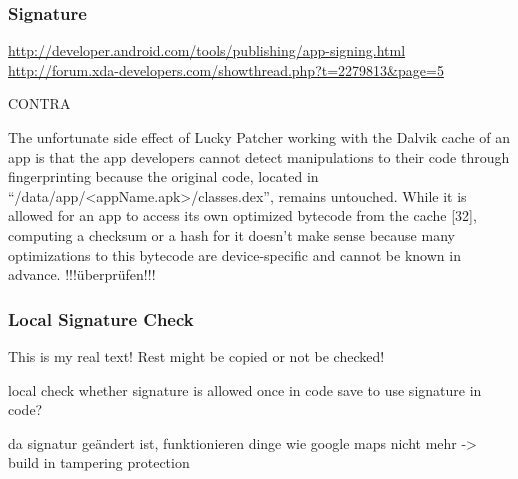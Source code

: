 \subsubsection{Signature} \label{subsection:counter-improve-tampering-signature}




\url{http://developer.android.com/tools/publishing/app-signing.html}\newline
\url{http://forum.xda-developers.com/showthread.php?t=2279813&page=5}\newline

CONTRA\newline


The unfortunate side effect of Lucky Patcher working with the Dalvik cache of an app is that the app developers cannot detect manipulations to their code through fingerprinting because the original code, located in “/data/app/<appName.apk>/classes.dex”, remains untouched. While it is allowed for an app to access its own optimized bytecode from the cache [32], computing a checksum or a hash for it doesn’t make sense because many optimizations to this bytecode are device-specific and cannot be known in advance.
\cite{munteanLicense}
!!!überprüfen!!!


\subsubsection{Local Signature Check} \label{subsection:counter-tampering-signature-local}
This is my real text! Rest might be copied or not be checked!



local check whether signature is allowed\newline
once in code \newline
save to use signature in code?\newline



da signatur geändert ist, funktionieren dinge wie google maps nicht mehr -> build in tampering protection
